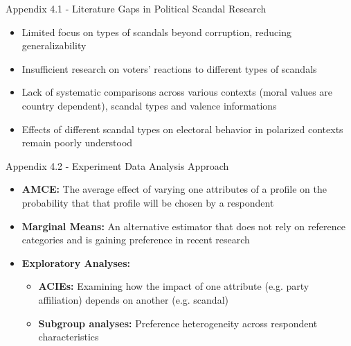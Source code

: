 \documentclass[9pt, aspectratio=169]{beamer}
\newcommand{\customcite}[1]{\textcolor{blue}{\footnotesize\parencite{#1}}}
\newcommand{\customcites}[1]{\textcolor{blue}{\footnotesize\parencites{#1}}}
\begin{document}
\begin{frame}{Appendix 4.1 - Literature Gaps in Political Scandal Research}
    \begin{itemize}
        \item Limited focus on types of scandals beyond corruption, reducing generalizability \customcite{kumlin2012scandal} \vspace{0.3cm}
        \item Insufficient research on voters' reactions to different types of scandals \vspace{0.3cm}
        \item Lack of systematic comparisons across various contexts (moral values are country dependent), scandal types and valence informations \customcite{kumlin2012scandal} \vspace{0.3cm}
        \item Effects of different scandal types on electoral behavior in polarized contexts remain poorly understood \customcites{puglisi2011, darr2019collision, Rottinghaus_2023} \vspace{0.3cm} 
    \end{itemize}
\end{frame}

\begin{frame}{Appendix 4.2 - Experiment Data Analysis Approach}
    \begin{itemize}
\item \textbf{AMCE:} The average effect of varying one attributes of a profile on the probability that that profile will be chosen by a respondent \customcite{BansakEtAl2022}\vspace{0.3cm} 
\item \textbf{Marginal Means:} An alternative estimator that does not rely on reference categories and is gaining preference in recent research \customcite{Casiraghi} \vspace{0.3cm} 
        \item \textbf{Exploratory Analyses:}  
        \begin{itemize}
            \item \textbf{ACIEs:} Examining how the impact of one attribute (e.g. party affiliation) depends on another (e.g. scandal) \vspace{0.2cm}  
            \item \textbf{Subgroup analyses:} Preference heterogeneity across respondent characteristics \customcite{Leeper_Hobolt_Tilley_2020} \vspace{0.2cm} 
        \end{itemize}
    \end{itemize}
\end{frame}
\end{document}
